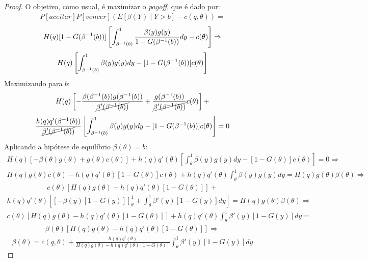 \begin{proof}
	O objetivo, como usual, é maximizar o \emph{payoff}, que é dado por:
	\begin{align*}
		P[aceitar]P[vencer](E[\beta(Y) \mid Y > b]-c(q,\theta)) = 
	\end{align*}
	\begin{align*}
		H(q)[1-G(\beta^{-1}(b))] \left[ \int_{\beta^{-1}(b)}^1 \frac{\beta(y)g(y)}{1-G(\beta^{-1}(b))}dy - c(\theta) \right] \Rightarrow
	\end{align*}
	\begin{align*}
		H(q) \left[ \int_{\beta^{-1}(b)}^1 \beta(y)g(y)dy - [1-G(\beta^{-1}(b))]c(\theta) \right]
	\end{align*}
	Maximizando para $b$:
	\begin{align*}
		H(q) \left[ -\frac{\beta(\beta^{-1}(b))g(\beta^{-1}(b))}{\cancel{\beta'(\beta^{-1}(b))}} + \frac{g(\beta^{-1}(b))}{\cancel{\beta'(\beta^{-1}(b))}}c(\theta) \right] +
	\end{align*}
	\begin{align*}
		\frac{h(q)q'(\beta^{-1}(b))}{\cancel{\beta'(\beta^{-1}(b))}} \left[ \int_{\beta^{-1}(b)}^1 \beta(y)g(y)dy - [1-G(\beta^{-1}(b))]c(\theta) \right] = 0
	\end{align*}
	Aplicando a hipótese de equilíbrio $\beta(\theta) = b$:
	\begin{align*}
		H(q) \left[ -\beta(\theta)g(\theta) + g(\theta)c(\theta) \right] + h(q)q'(\theta) \left[ \int_{\theta}^1 \beta(y)g(y)dy - [1-G(\theta)]c(\theta) \right] = 0 \Rightarrow
	\end{align*}
	\begin{align*}
		H(q)g(\theta)c(\theta)-h(q)q'(\theta)[1-G(\theta)]c(\theta) + h(q)q'(\theta) \int_{\theta}^1 \beta(y)g(y)dy = H(q)g(\theta)\beta(\theta) \Rightarrow
	\end{align*}
	\begin{align*}
		c(\theta)[H(q)g(\theta)-h(q)q'(\theta)[1-G(\theta)]] +
	\end{align*}
	\begin{align*} h(q)q'(\theta) \left[ [-\beta(y)[1-G(y)]]_{\theta}^1 + \int_{\theta}^1 \beta'(y)[1-G(y)]dy \right] = H(q)g(\theta)\beta(\theta) \Rightarrow
	\end{align*}
	\begin{align*}
		c(\theta)[H(q)g(\theta)-h(q)q'(\theta)[1-G(\theta)]] + h(q)q'(\theta) \int_{\theta}^1 \beta'(y)[1-G(y)]dy =
	\end{align*}
 	\begin{align*}
		\beta(\theta)[H(q)g(\theta) - h(q)q'(\theta)[1-G(\theta)]] \Rightarrow
	\end{align*}
	\begin{align*}
		\beta(\theta) = c(q,\theta) + \frac{h(q)q'(\theta)}{H(q)g(\theta) - h(q)q'(\theta)[1-G(\theta)]} \int_{\theta}^1 \beta'(y)[1-G(y)]dy
	\end{align*}
\end{proof}